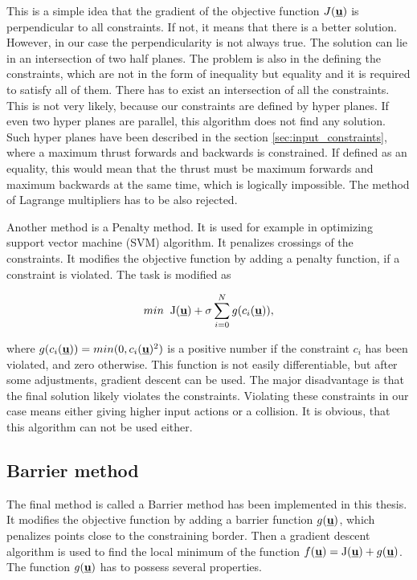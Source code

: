 \documentclass[a4paper,11pt,titlepage]{article}
\newcommand{\uvec}{\textbf{\underline{u}}}
\newcommand{\macf}{f(\uvec)}
\begin{document}
This is a simple idea that the gradient of the objective function $J(\uvec)$ is perpendicular to all constraints. If not, it means that there is a better solution. However, in our case the perpendicularity is not always true. The solution can lie in an intersection of two half planes. The problem is also in the defining the constraints, which are not in the form of inequality but equality and it is required to satisfy all of them. There has to exist an intersection of all the constraints. This is not very likely, because our constraints are defined by hyper planes. If even two hyper planes are parallel, this algorithm does not find any solution. Such hyper planes have been described in the section \ref{sec:input_constraints}, where a maximum thrust forwards and backwards is constrained. If defined as an equality, this would mean that the thrust must be maximum forwards and maximum backwards at the same time, which is logically impossible. The method of Lagrange multipliers has to be also rejected.

Another method is a Penalty method. It is used for example in optimizing support vector machine (SVM) algorithm. It penalizes crossings of the constraints. It modifies the objective function by adding a penalty function, if a constraint is violated. The task is modified as 

\begin{equation}
min\;\;\mathrm{J}(\uvec) + \sigma\sum_{i = 0}^N g(c_i(\uvec)),
\end{equation}

where $g(c_i(\uvec)) = min(0, c_i(\uvec)^2)$ is a positive number if the constraint $c_i$ has been violated, and zero otherwise. This function is not easily differentiable, but after some adjustments, gradient descent can be used. The major disadvantage is that the final solution likely violates the constraints. Violating these constraints in our case means either giving higher input actions or a collision. It is obvious, that this algorithm can not be used either.

\subsection{Barrier method}
The final method is called a Barrier method has been implemented in this thesis. It modifies the objective function by adding a barrier function $g(\uvec)$, which penalizes points close to the constraining border. Then a gradient descent algorithm is used to find the local minimum of the function $\macf = \mathrm{J}(\uvec) + g(\uvec)$. The function $g(\uvec)$ has to possess several properties. 
\end{document}
